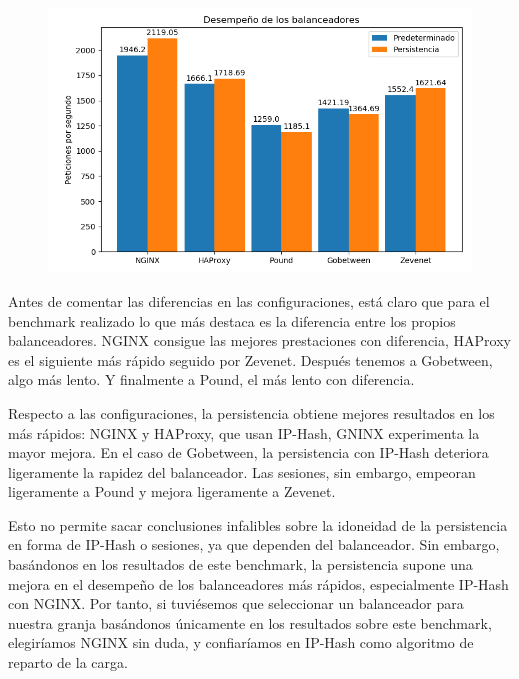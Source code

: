 \documentclass{article}
\begin{document}
\begin{figure}[H]
	\centering
	\includegraphics[width=140mm]{imgs/grafico}
\end{figure}

Antes de comentar las diferencias en las configuraciones, está claro que para el benchmark realizado lo que más destaca
es la diferencia entre los propios balanceadores. NGINX consigue las mejores prestaciones con diferencia, HAProxy es el
siguiente más rápido seguido por Zevenet. Después tenemos a Gobetween, algo más lento. Y finalmente a Pound, el más
lento con diferencia.

Respecto a las configuraciones, la persistencia obtiene mejores resultados en los más rápidos: NGINX y HAProxy, que
usan IP-Hash, GNINX experimenta la mayor mejora. En el caso de Gobetween, la persistencia con IP-Hash deteriora ligeramente
la rapidez del balanceador. Las sesiones, sin embargo, empeoran ligeramente a Pound y mejora ligeramente a Zevenet.

Esto no permite sacar conclusiones infalibles sobre la idoneidad de la persistencia en forma de IP-Hash o sesiones, ya que dependen
del balanceador. Sin embargo, basándonos en los resultados de este benchmark, la persistencia supone una mejora en el
desempeño de los balanceadores más rápidos, especialmente IP-Hash con NGINX. Por tanto, si tuviésemos que seleccionar un
 balanceador para nuestra granja basándonos únicamente en los resultados sobre este benchmark, elegiríamos NGINX sin duda,
 y confiaríamos en IP-Hash como algoritmo de reparto de la carga.
\end{document}
